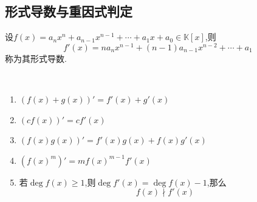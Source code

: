 \subsection{形式导数与重因式判定}
\begin{formal}
\begin{definition}[形式导数定义]\label{def:形式导数定义}
    设$f\left(x\right)=a_nx^n+a_{n-1}x^{n-1}+\cdots+a_1x+a_0\in\mathbb{K}\left[x\right]$,则
    \[
    f'\left(x\right)=na_{n}x^{n-1}+\left(n-1\right)a_{n-1}x^{n-2}+\cdots+a_1
    \]
    称为其形式导数.
\end{definition}
\end{formal}
\begin{formal}
\begin{theorem}[形式导数的若干性质]\,

    \begin{enumerate}[label={\textup{(\arabic*)}}]
        \item $\left(f\left(x\right)+g\left(x\right)\right)'=f'\left(x\right)+g'\left(x\right)$
        \item $\left(cf\left(x\right)\right)'=cf'\left(x\right)$
        \item $\left(f\left(x\right)g\left(x\right)\right)'=f'\left(x\right)g\left(x\right)+f\left(x\right)g'\left(x\right)$
        \item $\left(f\left(x\right)^m\right)'=mf\left(x\right)^{m-1}f'\left(x\right)$
        \item 若$\deg f\left(x\right)\geqslant 1$,则$\deg f'\left(x\right)=\deg f\left(x\right)-1$,那么
        \[
        f\left(x\right)\nmid f'\left(x\right)
        \]
    \end{enumerate}
\end{theorem}
\end{formal}
